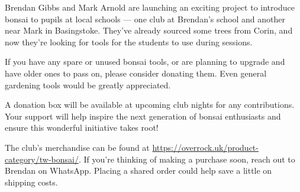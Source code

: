 \label{2025-10-news}
\noindent
Brendan Gibbs and Mark Arnold are launching an exciting project to introduce bonsai to pupils at local schools --- one club at Brendan's school and another near Mark in Basingstoke.
They've already sourced some trees from Corin, and now they're looking for tools for the students to use during sessions.

If you have any spare or unused bonsai tools, or are planning to upgrade and have older ones to pass on, please consider donating them.
Even general gardening tools would be greatly appreciated.

A donation box will be available at upcoming club nights for any contributions.
Your support will help inspire the next generation of bonsai enthusiasts and ensure this wonderful initiative takes root!


	
	

\medskip	
{}
\noindent
The club's merchandise can be found at \url{https://overrock.uk/product-category/tw-bonsai/}.
If you're thinking of making a purchase soon, reach out to Brendan on WhatsApp.
Placing a shared order could help save a little on shipping costs.

